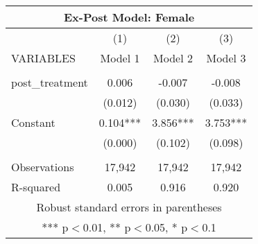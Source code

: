 \begin{tabular}{lccc}
\multicolumn{4}{c}{Ex-Post Model: Female} \\ \hline
 & (1) & (2) & (3) \\
VARIABLES & Model 1 & Model 2 & Model 3 \\ \hline
 &  &  &  \\
post\_treatment & 0.006 & -0.007 & -0.008 \\
 & (0.012) & (0.030) & (0.033) \\
Constant & 0.104*** & 3.856*** & 3.753*** \\
 & (0.000) & (0.102) & (0.098) \\
 &  &  &  \\
Observations & 17,942 & 17,942 & 17,942 \\
 R-squared & 0.005 & 0.916 & 0.920 \\ \hline
\multicolumn{4}{c}{ Robust standard errors in parentheses} \\
\multicolumn{4}{c}{ *** p$<$0.01, ** p$<$0.05, * p$<$0.1} \\
\end{tabular}
